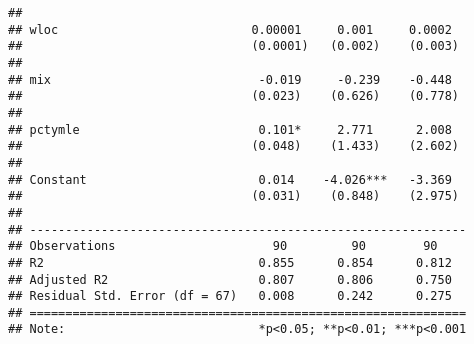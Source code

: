 \documentclass[
]{article}
\begin{document}
\begin{verbatim}
##                                                              
## wloc                           0.00001     0.001     0.0002  
##                                (0.0001)   (0.002)    (0.003) 
##                                                              
## mix                             -0.019     -0.239    -0.448  
##                                (0.023)    (0.626)    (0.778) 
##                                                              
## pctymle                         0.101*     2.771      2.008  
##                                (0.048)    (1.433)    (2.602) 
##                                                              
## Constant                        0.014    -4.026***   -3.369  
##                                (0.031)    (0.848)    (2.975) 
##                                                              
## -------------------------------------------------------------
## Observations                      90         90        90    
## R2                              0.855      0.854      0.812  
## Adjusted R2                     0.807      0.806      0.750  
## Residual Std. Error (df = 67)   0.008      0.242      0.275  
## =============================================================
## Note:                           *p<0.05; **p<0.01; ***p<0.001
\end{verbatim}
\end{document}
